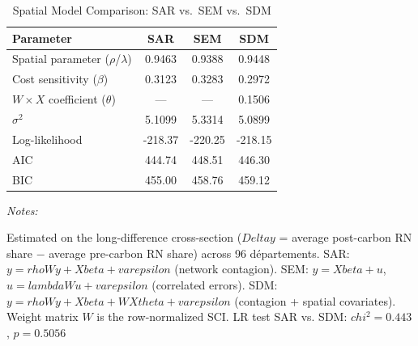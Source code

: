 \begin{table}[!h]
\centering
\caption{Spatial Model Comparison: SAR vs.\ SEM vs.\ SDM}
\centering
\fontsize{10}{12}\selectfont
\begin{threeparttable}
\begin{tabular}[t]{lccc}
\toprule
Parameter & SAR & SEM & SDM\\
\midrule
Spatial parameter ($\rho$/$\lambda$) & 0.9463 & 0.9388 & 0.9448\\
Cost sensitivity ($\beta$) & 0.3123 & 0.3283 & 0.2972\\
$W \times X$ coefficient ($\theta$) & --- & --- & 0.1506\\
$\sigma^2$ & 5.1099 & 5.3314 & 5.0899\\
Log-likelihood & -218.37 & -220.25 & -218.15\\
AIC & 444.74 & 448.51 & 446.30\\
BIC & 455.00 & 458.76 & 459.12\\
\bottomrule
\end{tabular}
\begin{tablenotes}
\item \textit{Notes:} 
\item Estimated on the long-difference cross-section ($Delta y$ = average post-carbon RN share $-$ average pre-carbon RN share) across 96 d\'{e}partements. SAR: $y = rho W y + Xbeta + varepsilon$ (network contagion). SEM: $y = Xbeta + u$, $u = lambda W u + varepsilon$ (correlated errors). SDM: $y = rho W y + Xbeta + W Xtheta + varepsilon$ (contagion + spatial covariates). Weight matrix $W$ is the row-normalized SCI. LR test SAR vs. SDM: $chi^2 = 0.443$, $p = 0.5056$
\end{tablenotes}
\end{threeparttable}
\end{table}
